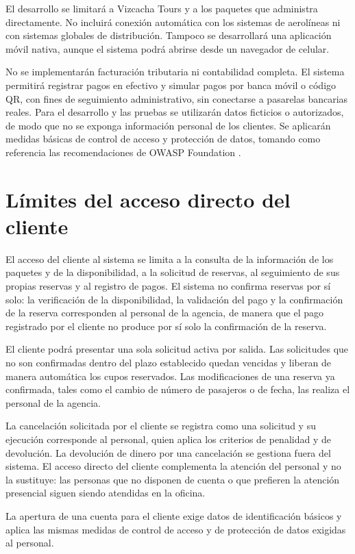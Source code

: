\label{cap:limites}

El desarrollo se limitará a Vizcacha Tours y a los paquetes que administra
directamente. No incluirá conexión automática con los sistemas de aerolíneas
ni con sistemas globales de distribución. Tampoco se desarrollará una
aplicación móvil nativa, aunque el sistema podrá abrirse desde un navegador de
celular.

No se implementarán facturación tributaria ni contabilidad completa. El
sistema permitirá registrar pagos en efectivo y simular pagos por banca móvil
o código QR, con fines de seguimiento administrativo, sin conectarse a
pasarelas bancarias reales. Para el desarrollo y las pruebas se utilizarán
datos ficticios o autorizados, de modo que no se exponga información personal
de los clientes. Se aplicarán medidas básicas de control de acceso y
protección de datos, tomando como referencia las recomendaciones de OWASP
Foundation \parencite{owasp2025}.

\section*{Límites del acceso directo del cliente}

El acceso del cliente al sistema se limita a la consulta de la información de
los paquetes y de la disponibilidad, a la solicitud de reservas, al
seguimiento de sus propias reservas y al registro de pagos. El sistema no
confirma reservas por sí solo: la verificación de la disponibilidad, la
validación del pago y la confirmación de la reserva corresponden al personal de
la agencia, de manera que el pago registrado por el cliente no produce por sí
solo la confirmación de la reserva.

El cliente podrá presentar una sola solicitud activa por salida. Las
solicitudes que no son confirmadas dentro del plazo establecido quedan
vencidas y liberan de manera automática los cupos reservados. Las
modificaciones de una reserva ya confirmada, tales como el cambio de número de
pasajeros o de fecha, las realiza el personal de la agencia.

La cancelación solicitada por el cliente se registra como una solicitud y su
ejecución corresponde al personal, quien aplica los criterios de penalidad y
de devolución. La devolución de dinero por una cancelación se gestiona fuera
del sistema. El acceso directo del cliente complementa la atención del
personal y no la sustituye: las personas que no disponen de cuenta o que
prefieren la atención presencial siguen siendo atendidas en la oficina.

La apertura de una cuenta para el cliente exige datos de identificación
básicos y aplica las mismas medidas de control de acceso y de protección de
datos exigidas al personal.
